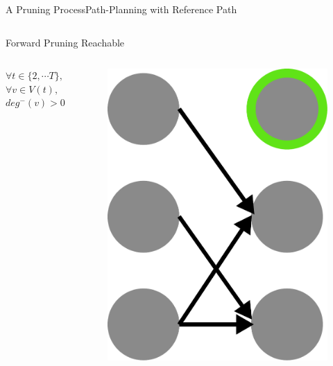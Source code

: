 \begin{frame}{A Pruning Process}{Path-Planning with Reference Path}

\begin{columns}

\begin{block}{Forward Pruning}
Reachable 
\begin{columns}
\tiny{
\noindent
$ \forall t \in \{ 2, \cdots T \}, $ \\
$ \forall v \in V(t), $  \\
$ deg^{-}(v) > 0 $
}
\begin{figure}
\centering
\includegraphics[width = \textwidth]{./figure/forward_prune}
\end{figure}
\end{columns}
\end{block}



\end{columns}
\end{frame}
